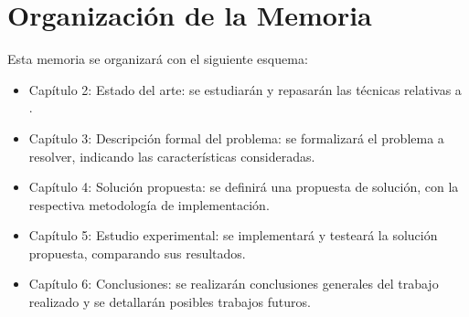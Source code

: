 \section{Organización de la Memoria}

Esta memoria se organizará con el siguiente esquema:
\begin{itemize}
	\item Capítulo 2: Estado del arte: se estudiarán y repasarán las técnicas relativas a .
	\item Capítulo 3: Descripción formal del problema: se formalizará el problema a resolver, indicando las características consideradas.
	\item Capítulo 4: Solución propuesta: se definirá una propuesta de solución, con la respectiva metodología de implementación. 
	\item Capítulo 5: Estudio experimental: se implementará y testeará la solución propuesta, comparando sus resultados.
	\item Capítulo 6: Conclusiones: se realizarán conclusiones generales del trabajo realizado y se detallarán posibles trabajos futuros.
\end{itemize}
